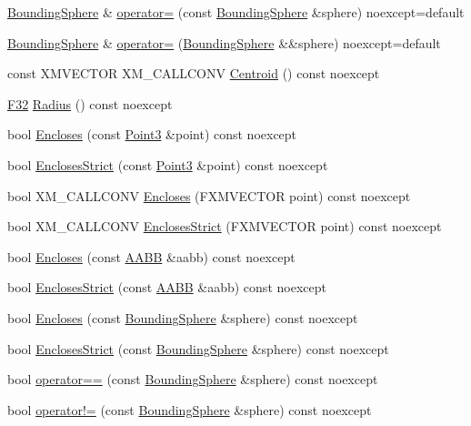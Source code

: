 \begin{DoxyCompactItemize}
\item 
\hyperlink{classmage_1_1_bounding_sphere}{Bounding\+Sphere} \& \hyperlink{classmage_1_1_bounding_sphere_ad8159156e4258d23afdb43e4a9104743}{operator=} (const \hyperlink{classmage_1_1_bounding_sphere}{Bounding\+Sphere} \&sphere) noexcept=default
\item 
\hyperlink{classmage_1_1_bounding_sphere}{Bounding\+Sphere} \& \hyperlink{classmage_1_1_bounding_sphere_a2a0e22660b37c54bb0e2e76efc198281}{operator=} (\hyperlink{classmage_1_1_bounding_sphere}{Bounding\+Sphere} \&\&sphere) noexcept=default
\item 
const X\+M\+V\+E\+C\+T\+OR X\+M\+\_\+\+C\+A\+L\+L\+C\+O\+NV \hyperlink{classmage_1_1_bounding_sphere_ae31660bd7333227d3f5e75b3243b8263}{Centroid} () const noexcept
\item 
\hyperlink{namespacemage_aa97e833b45f06d60a0a9c4fc22ae02c0}{F32} \hyperlink{classmage_1_1_bounding_sphere_a51c7e6db89c68d192961bfaf2114fb2f}{Radius} () const noexcept
\item 
bool \hyperlink{classmage_1_1_bounding_sphere_a7a6e27ec28a95caaef46f633b21af54e}{Encloses} (const \hyperlink{structmage_1_1_point3}{Point3} \&point) const noexcept
\item 
bool \hyperlink{classmage_1_1_bounding_sphere_a749a8fa3317e5490c12b049e68f7d502}{Encloses\+Strict} (const \hyperlink{structmage_1_1_point3}{Point3} \&point) const noexcept
\item 
bool X\+M\+\_\+\+C\+A\+L\+L\+C\+O\+NV \hyperlink{classmage_1_1_bounding_sphere_a5174af3edc1f3a5635df5395b54ae352}{Encloses} (F\+X\+M\+V\+E\+C\+T\+OR point) const noexcept
\item 
bool X\+M\+\_\+\+C\+A\+L\+L\+C\+O\+NV \hyperlink{classmage_1_1_bounding_sphere_ad75f41a261dd2e366457543b6150718a}{Encloses\+Strict} (F\+X\+M\+V\+E\+C\+T\+OR point) const noexcept
\item 
bool \hyperlink{classmage_1_1_bounding_sphere_a35feaaaf141319bdf37fca4da0ed0fc0}{Encloses} (const \hyperlink{classmage_1_1_a_a_b_b}{A\+A\+BB} \&aabb) const noexcept
\item 
bool \hyperlink{classmage_1_1_bounding_sphere_ac1598f0dcef439855f203fbd6357e6f7}{Encloses\+Strict} (const \hyperlink{classmage_1_1_a_a_b_b}{A\+A\+BB} \&aabb) const noexcept
\item 
bool \hyperlink{classmage_1_1_bounding_sphere_ac5989739e15d3525bbb805f9c457ad4d}{Encloses} (const \hyperlink{classmage_1_1_bounding_sphere}{Bounding\+Sphere} \&sphere) const noexcept
\item 
bool \hyperlink{classmage_1_1_bounding_sphere_a8f0fc134762fb9a00b47d62cc09c7703}{Encloses\+Strict} (const \hyperlink{classmage_1_1_bounding_sphere}{Bounding\+Sphere} \&sphere) const noexcept
\item 
bool \hyperlink{classmage_1_1_bounding_sphere_adc183c59a09a071fbc78b833cc66f218}{operator==} (const \hyperlink{classmage_1_1_bounding_sphere}{Bounding\+Sphere} \&sphere) const noexcept
\item 
bool \hyperlink{classmage_1_1_bounding_sphere_a841979aaee8a82784674296801aa5fbc}{operator!=} (const \hyperlink{classmage_1_1_bounding_sphere}{Bounding\+Sphere} \&sphere) const noexcept
\end{DoxyCompactItemize}
